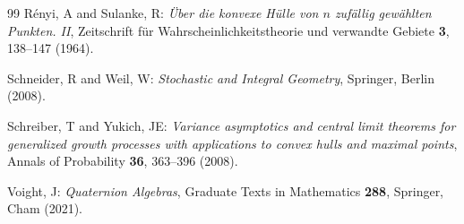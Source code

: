 \documentclass[11pt,a4paper]{article}
\theoremstyle{plain}
\theoremstyle{definition}
\theoremstyle{remark}
\begin{document}
\begin{thebibliography}{99}
	R\'enyi, A and Sulanke, R:
	\emph{\"Uber die konvexe H\"ulle von $n$ zuf\"allig gew\"ahlten Punkten. II},
	Zeitschrift für Wahrscheinlichkeitstheorie und verwandte Gebiete \textbf{3}, 138--147 (1964).

	Schneider, R and Weil, W:
	\emph{Stochastic and Integral Geometry},
	Springer, Berlin (2008).

	Schreiber, T and Yukich, JE:
	\emph{Variance asymptotics and central limit theorems for generalized growth processes with applications to convex hulls and maximal points},
	Annals of Probability \textbf{36}, 363--396 (2008).

	Voight, J:
	\emph{Quaternion Algebras},
	Graduate Texts in Mathematics \textbf{288},
	Springer, Cham (2021).

\end{thebibliography}
\end{document}
